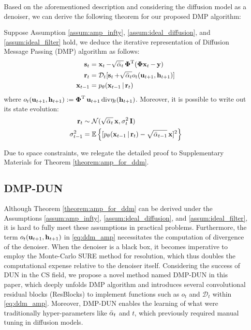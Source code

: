 \documentclass[10pt,twocolumn,letterpaper]{article}
\begin{document}
Based on the aforementioned description and considering the diffusion model as a denoiser, we can derive the following theorem for our proposed DMP algorithm:
\begin{theorem} \label{theorem:amp_for_ddm}
	Suppose Assumption \ref{assum:amp_infty}, \ref{assum:ideal_diffusion}, and \ref{assum:ideal_filter} hold, we deduce the iterative representation of Diffusion Message Passing (DMP) algorithm as follows:
	\begin{equation} \label{eq:ddm_amp}
		\begin{aligned}
			\operatorname{\mathbf{s}}_t &= \operatorname{\mathbf{x}}_t - \sqrt{\operatorname{\bar{\alpha}}_t} \operatorname{\mathbf{\Phi}}^\mathrm{T}(\operatorname{\mathbf{\Phi x}}_t - \operatorname{\mathbf{y}}) \\
			\operatorname{\mathbf{r}}_t &= \mathcal{D}_t[ \operatorname{\mathbf{s}}_t + \sqrt{\operatorname{\bar{\alpha}}_t} o_t(\operatorname{\mathbf{u}}_{t+1}, \operatorname{\mathbf{h}}_{t+1})]\\
			\operatorname{\mathbf{x}}_{t-1} &= p_\theta(\operatorname{\mathbf{x}}_{t-1}|\operatorname{\mathbf{r}}_t)
		\end{aligned}
	\end{equation}
	where $o_t(\operatorname{\mathbf{u}}_{t+1}, \operatorname{\mathbf{h}}_{t+1}) := \operatorname{\mathbf{\Phi}}^\mathrm{T} \operatorname{\mathbf{u}}_{t+1} \mathrm{div}\eta_t(\operatorname{\mathbf{h}}_{t+1})$. Moreover, it is possible to write out its state evolution:
	\begin{equation} \label{eq:ddm_amp_se}
		\begin{aligned}
			\operatorname{\mathbf{r}}_t &\sim \mathcal{N} (\sqrt{\operatorname{\bar{\alpha}}_t}\operatorname{\mathbf{x}}, \sigma^2_t \operatorname{\mathbf{I}}) \\
			\sigma^2_{t-1} &= \mathbb{E}\left\{ [p_\theta(\operatorname{\mathbf{x}}_{t-1}|\operatorname{\mathbf{r}}_t) - \sqrt{\operatorname{\bar{\alpha}}_{t-1}}\operatorname{\mathbf{x}}]^2 \right\}
		\end{aligned}
	\end{equation}
\end{theorem}

Due to space constraints, we relegate the detailed proof to Supplementary Materials for Theorem \ref{theorem:amp_for_ddm}.


\subsection{DMP-DUN} \label{subsec:ddamp}
Although Theorem \ref{theorem:amp_for_ddm} can be derived under the Assumptions \ref{assum:amp_infty}, \ref{assum:ideal_diffusion}, and \ref{assum:ideal_filter}, it is hard to fully meet these assumptions in practical problems. Furthermore, the term $o_t(\operatorname{\mathbf{u}}_{t+1}, \operatorname{\mathbf{h}}_{t+1})$ in \cref{eq:ddm_amp} necessitates the computation of divergence of the denoiser. When the denoiser is a black box, it becomes imperative to employ the Monte-Carlo SURE\cite{DBLP:journals/tip/RamaniBU08} method for resolution, which thus doubles the computational expense relative to the denoiser itself. Considering the success of DUN in the CS field, we propose a novel method named DMP-DUN in this paper, which deeply unfolds DMP algorithm and introduces several convolutional residual blocks (ResBlocks) to implement functions such as $o_t$ and $\mathcal{D}_t$ within \cref{eq:ddm_amp}. Moreover, DMP-DUN enables the learning of what were traditionally hyper-parameters like $\operatorname{\bar{\alpha}}_t$ and $t$, which previously required manual tuning in diffusion models. 
\end{document}
